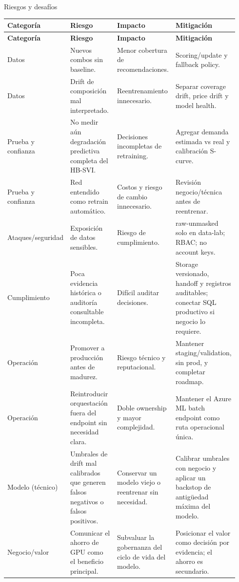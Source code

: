 \documentclass[11pt,letterpaper]{article}
\makeatletter
\renewcommand\section{\@startsection{section}{1}{\z@}
  {-3.5ex \@plus -1ex \@minus -.2ex}
  {2.3ex \@plus .2ex}
  {\Large\bfseries\sffamily\color{azulTec}}}
\makeatother
\begin{document}
\section{Riesgos y desafíos}

\begin{longtable}{L{0.22\linewidth}L{0.27\linewidth}L{0.25\linewidth}L{0.20\linewidth}}
\toprule
\textbf{Categoría} & \textbf{Riesgo} & \textbf{Impacto} & \textbf{Mitigación} \\
\midrule
\endfirsthead
\toprule
\textbf{Categoría} & \textbf{Riesgo} & \textbf{Impacto} & \textbf{Mitigación} \\
\midrule
\endhead
Datos & Nuevos combos sin baseline. & Menor cobertura de recomendaciones. & Scoring/update y fallback policy. \\
Datos & Drift de composición mal interpretado. & Reentrenamiento innecesario. & Separar coverage drift, price drift y model health. \\
Prueba y confianza & No medir aún degradación predictiva completa del HB-SVI. & Decisiones incompletas de retraining. & Agregar demanda estimada vs real y calibración S-curve. \\
Prueba y confianza & Red entendido como retrain automático. & Costos y riesgo de cambio innecesario. & Revisión negocio/técnica antes de reentrenar. \\
Ataques/seguridad & Exposición de datos sensibles. & Riesgo de cumplimiento. & raw-unmasked solo en data-lab; RBAC; no account keys. \\
Cumplimiento & Poca evidencia histórica o auditoría consultable incompleta. & Difícil auditar decisiones. & Storage versionado, handoff y registros auditables; conectar SQL productivo si negocio lo requiere. \\
Operación & Promover a producción antes de madurez. & Riesgo técnico y reputacional. & Mantener staging/validation, sin prod, y completar roadmap. \\
Operación & Reintroducir orquestación fuera del endpoint sin necesidad clara. & Doble ownership y mayor complejidad. & Mantener el Azure ML batch endpoint como ruta operacional única. \\
Modelo (técnico) & Umbrales de drift mal calibrados que generen falsos negativos o falsos positivos. & Conservar un modelo viejo o reentrenar sin necesidad. & Calibrar umbrales con negocio y aplicar un backstop de antigüedad máxima del modelo. \\
Negocio/valor & Comunicar el ahorro de GPU como el beneficio principal. & Subvaluar la gobernanza del ciclo de vida del modelo. & Posicionar el valor como decisión por evidencia; el ahorro es secundario. \\
\bottomrule
\end{longtable}
\end{document}
